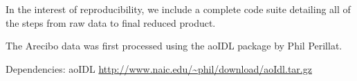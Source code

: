 % 
% 
% 
% 

In the interest of reproducibility, we include a complete code suite detailing
all of the steps from raw data to final reduced product.

The Arecibo data was first processed using the aoIDL package by Phil Perillat.

Dependencies:
aoIDL \url{http://www.naic.edu/~phil/download/aoIdl.tar.gz}




